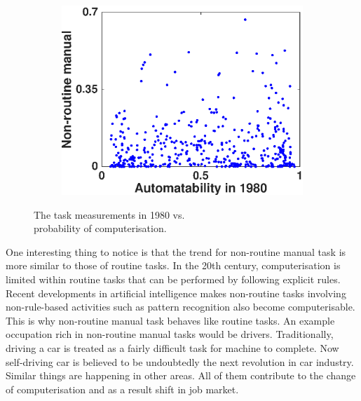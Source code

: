 \documentclass[11pt]{report}
\numberwithin{equation}{chapter}
\begin{document}
\begin{spacing}{2}
\begin{figure}[!htb]
\begin{subfigure}{0.5\textwidth}
	\includegraphics[scale = 0.5]{non-routine_manual.eps}
\end{subfigure}

\caption{The task measurements in 1980 vs. \\probability of computerisation.}
\label{fig:1980}
\end{figure}


One interesting thing to notice is that the trend for non-routine manual task is more similar to those of routine tasks. In the 20th century, computerisation is limited within routine tasks that can be performed by following explicit rules. Recent developments in artificial intelligence makes non-routine tasks involving non-rule-based activities such as pattern recognition also become computerisable. This is why non-routine manual task behaves like routine tasks. An example occupation rich in non-routine manual tasks would be drivers. Traditionally, driving a car is treated as a fairly difficult task for machine to complete. Now self-driving car is believed to be undoubtedly the next revolution in car industry. Similar things are happening in other areas. All of them contribute to the change of computerisation and as a result shift in job market.



\begin{figure}[htb]


\end{figure}
\end{spacing}
\end{document}
